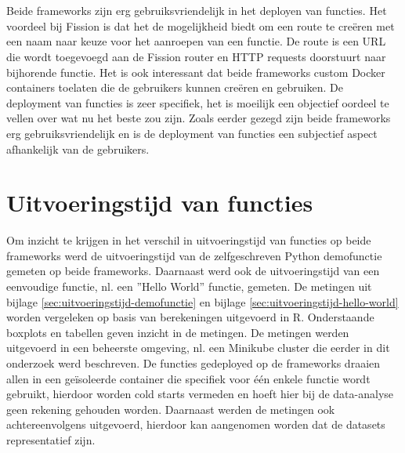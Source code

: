 \\\\
Beide frameworks zijn erg gebruiksvriendelijk in het deployen van functies. Het voordeel bij Fission is dat het de mogelijkheid biedt om een route te creëren met een naam naar keuze voor het aanroepen van een functie. De route is een URL die wordt toegevoegd aan de Fission router en HTTP requests doorstuurt naar bijhorende functie. Het is ook interessant dat beide frameworks custom Docker containers toelaten die de gebruikers kunnen creëren en gebruiken. 
De deployment van functies is zeer specifiek, het is moeilijk een objectief oordeel te vellen over wat nu het beste zou zijn. Zoals eerder gezegd zijn beide frameworks erg gebruiksvriendelijk en is de deployment van functies een subjectief aspect afhankelijk van de gebruikers.

\section{Uitvoeringstijd van functies}
\label{sec:vergelijking-uitvoeringstijd}
Om inzicht te krijgen in het verschil in uitvoeringstijd van functies op beide frameworks werd de uitvoeringstijd van de zelfgeschreven Python demofunctie gemeten op beide frameworks. Daarnaast werd ook de uitvoeringstijd van een eenvoudige functie, nl. een ''Hello World'' functie, gemeten. De metingen uit bijlage \ref{sec:uitvoeringstijd-demofunctie} en bijlage \ref{sec:uitvoeringstijd-hello-world} worden vergeleken op basis van  berekeningen uitgevoerd in R. Onderstaande boxplots en tabellen geven inzicht in de metingen. De metingen werden uitgevoerd in een beheerste omgeving, nl. een Minikube cluster die eerder in dit onderzoek werd beschreven. De functies gedeployed op de frameworks draaien allen in een geïsoleerde container die specifiek voor één enkele functie wordt gebruikt, hierdoor worden cold starts vermeden en hoeft hier bij de data-analyse geen rekening gehouden worden. Daarnaast werden de metingen ook achtereenvolgens uitgevoerd, hierdoor kan aangenomen worden dat de datasets representatief zijn.

\newpage
